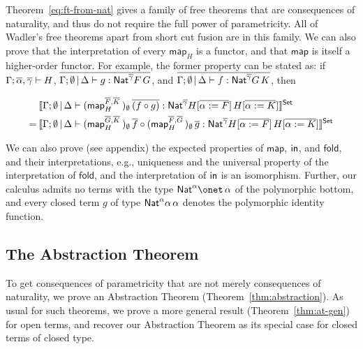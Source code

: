 \documentclass[runningheads]{llncs}
\newcommand{\map}{\mathsf{map}}
\newcommand{\fold}{\mathsf{fold}}
\begin{document}
\vspace*{-0.1in}
  
\noindent
Theorem~\ref{eq:ft-from-nat} gives a family of free theorems that are
consequences of naturality, and thus do not require the full power of
parametricity. All of Wadler's free theorems apart from short cut
fusion are in this family. We can also prove that the interpretation
of every $\map_H$ is a functor, and that $\map$ is itself a
higher-order functor. For example, the former property can be stated
as: if $\Gamma; \overline{\alpha}, \overline{\gamma} \vdash H$, $\overline{\Gamma; \emptyset
  \,|\, \Delta \vdash g : \mathsf{Nat}^{\overline{\gamma}} F \, G}$, and $\overline{\Gamma;
  \emptyset \,|\, \Delta \vdash f : \mathsf{Nat}^{\overline{\gamma}} G \, K}$, then

  \vspace*{-0.2in}
  
  \begin{align*}
&\setsem{
\Gamma; \emptyset \,|\, \Delta \vdash 
  (\map^{\ol{F}, \ol{K}}_H \,)_{\emptyset} \, \ol{(f \circ g)}
  : \Nat^{\ol\gamma} H[\ol{\alpha := F}] \, H[\ol{\alpha := K}]} \\ 
= \hspace{0.03in} 
  &\setsem{
  \Gamma; \emptyset \,|\, \Delta \vdash 
  (\map^{\ol{G}, \ol{K}}_H \,)_{\emptyset} \, \ol{f} \circ 
  (\map^{\ol{F}, \ol{G}}_H \,)_{\emptyset} \, \ol{g}
  : \Nat^{\ol\gamma} H[\ol{\alpha := F}] \, H[\ol{\alpha := K}]}
\end{align*}

    \vspace*{-0.05in}
  
\noindent
We can also prove (see appendix) the expected properties of $\map$,
$\mathsf{in}$, and $\fold$, and their interpretations, e.g., uniqueness and
the universal property of the interpretation of $\fold$, and the
interpretation of $\mathsf{in}$ is an isomorphism. Further, our calculus
admits no terms with the type $\Nat^\alpha \onet \,\alpha$ of the
polymorphic bottom, and every closed term $g$ of type
$\mathsf{Nat}^\alpha\alpha\,\alpha$ denotes the polymorphic identity
function. 


\vspace*{-0.1in}

\subsection{The Abstraction Theorem}\label{sec:thms} 

\vspace*{-0.05in}

To get consequences of parametricity that are not merely consequences
of naturality, we prove an Abstraction Theorem
(Theorem~\ref{thm:abstraction}). As usual for such theorems, we prove
a more general result (Theorem~\ref{thm:at-gen}) for open terms, and
recover our Abstraction Theorem as its special case for closed terms
of closed type.
\end{document}
